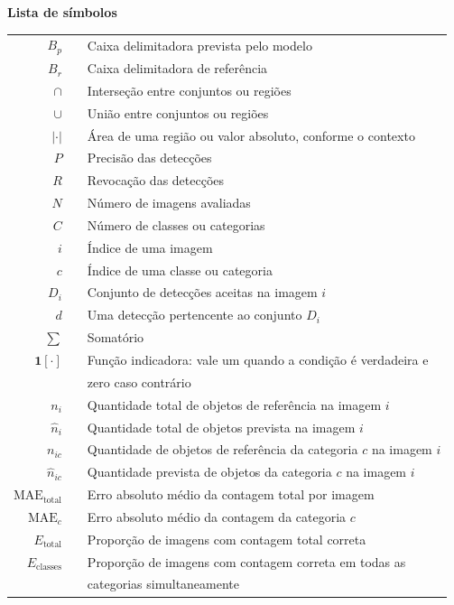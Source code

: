 \thispagestyle{empty}
\centering\textbf{Lista de símbolos}
\vspace{6pt}

\vspace{12pt}

\hspace{0.5cm}
\raggedright
\begingroup
\renewcommand{\arraystretch}{1.15}
\begin{tabular}{r l}
    $B_p$~~
    &
    Caixa delimitadora prevista pelo modelo
    \\
    $B_r$~~
    &
    Caixa delimitadora de referência
    \\
    $\cap$~~
    &
    Interseção entre conjuntos ou regiões
    \\
    $\cup$~~
    &
    União entre conjuntos ou regiões
    \\
    $|\cdot|$~~
    &
    Área de uma região ou valor absoluto, conforme o contexto
    \\
    $P$~~
    &
    Precisão das detecções
    \\
    $R$~~
    &
    Revocação das detecções
    \\
    $N$~~
    &
    Número de imagens avaliadas
    \\
    $C$~~
    &
    Número de classes ou categorias
    \\
    $i$~~
    &
    Índice de uma imagem
    \\
    $c$~~
    &
    Índice de uma classe ou categoria
    \\
    $D_i$~~
    &
    Conjunto de detecções aceitas na imagem $i$
    \\
    $d$~~
    &
    Uma detecção pertencente ao conjunto $D_i$
    \\
    $\sum$~~
    &
    Somatório
    \\
    $\mathbf{1}[\cdot]$~~
    &
    Função indicadora: vale um quando a condição é verdadeira e
    \\
    ~~
    &
    zero caso contrário
    \\
    $n_i$~~
    &
    Quantidade total de objetos de referência na imagem $i$
    \\
    $\widehat{n}_i$~~
    &
    Quantidade total de objetos prevista na imagem $i$
    \\
    $n_{ic}$~~
    &
    Quantidade de objetos de referência da categoria $c$ na imagem $i$
    \\
    $\widehat{n}_{ic}$~~
    &
    Quantidade prevista de objetos da categoria $c$ na imagem $i$
    \\
    $\mathrm{MAE}_{\mathrm{total}}$~~
    &
    Erro absoluto médio da contagem total por imagem
    \\
    $\mathrm{MAE}_{c}$~~
    &
    Erro absoluto médio da contagem da categoria $c$
    \\
    $E_{\mathrm{total}}$~~
    &
    Proporção de imagens com contagem total correta
    \\
    $E_{\mathrm{classes}}$~~
    &
    Proporção de imagens com contagem correta em todas as 
    \\
    ~~
    &
    categorias simultaneamente
\end{tabular}
\endgroup